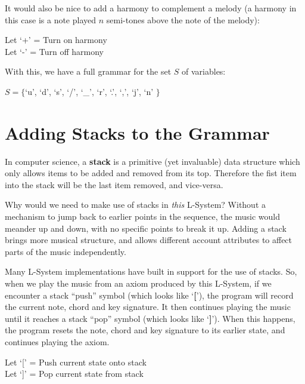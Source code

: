 It would also be nice to add a harmony to complement a melody (a harmony in this case is a note played $n$ semi-tones above the note of the melody):

\begin{singlespace}
\begin{formality}
Let `+' = Turn on harmony\\
Let `-' = Turn off harmony
\end{formality}
\end{singlespace}

With this, we have a full grammar for the set $S$ of variables:

\begin{singlespace}
\begin{formality}
$S = \{ $`u', `d', `s', `/', `\_', `r', `.', `,', `j', `n' $\}$
\end{formality}
\end{singlespace}

\section{Adding Stacks to the Grammar}

In computer science, a \textbf{stack} is a primitive (yet invaluable) data structure which only allows items to be added and removed from its top. Therefore the fist item into the stack will be the last item removed, and vice-versa.

Why would we need to make use of stacks in \textit{this} L-System? Without a mechanism to jump back to earlier points in the sequence, the music would meander up and down, with no specific points to break it up. Adding a stack brings more musical structure, and allows different account attributes to affect parts of the music independently.

Many L-System implementations have built in support for the use of stacks. So, when we play the music from an axiom produced by this L-System, if we encounter a stack ``push'' symbol  (which looks like `\textbf{[}'), the program will record the current note, chord and key signature. It then continues playing the music until it reaches a stack ``pop'' symbol (which looks like `\textbf{]}'). When this happens, the program resets the note, chord and key signature to its earlier state, and continues playing the axiom.

\begin{singlespace}
\begin{formality}
Let `[' = Push current state onto stack\\
Let `]' = Pop current state from stack
\end{formality}
\end{singlespace}

